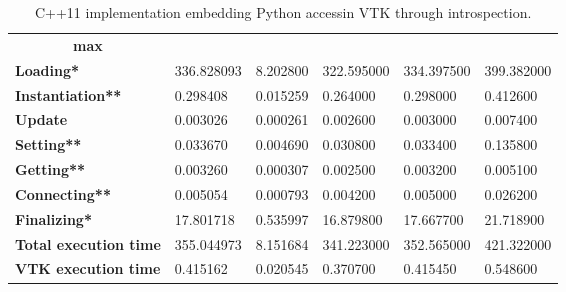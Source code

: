 \begin{table}[t]
\begin{subtable}{\textwidth}
{\begin{tabular}{llllll}
      \multicolumn{1}{c}{\textbf{max}} \\ \hhline{======}
    \textbf{Loading*}             & 336.828093 & 8.202800 & 322.595000 & 334.397500 & 399.382000 \\
    \textbf{Instantiation**}      & 0.298408   & 0.015259 & 0.264000   & 0.298000   & 0.412600   \\
    \textbf{Update}               & 0.003026   & 0.000261 & 0.002600   & 0.003000   & 0.007400   \\
    \textbf{Setting**}            & 0.033670   & 0.004690 & 0.030800   & 0.033400   & 0.135800   \\
    \textbf{Getting**}            & 0.003260   & 0.000307 & 0.002500   & 0.003200   & 0.005100   \\
    \textbf{Connecting**}         & 0.005054   & 0.000793 & 0.004200   & 0.005000   & 0.026200   \\
    \textbf{Finalizing*}          & 17.801718  & 0.535997 & 16.879800  & 17.667700  & 21.718900  \\ \hline
    \textbf{Total execution time} & 355.044973 & 8.151684 & 341.223000 & 352.565000 & 421.322000 \\ \hline
    \textbf{VTK execution time}   & 0.415162   & 0.020545 & 0.370700   & 0.415450   & 0.548600  
    \end{tabular}}
  \end{subtable}
  \vspace*{.5truecm}
  \newline
  \begin{subtable}{\textwidth}
    \centering
    \caption{C++11 implementation embedding Python accessin VTK through introspection.}
    \label{tab:cpp-introspection-tests}
\end{subtable}
\end{table}

